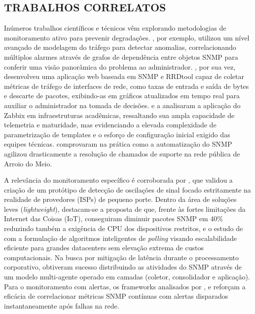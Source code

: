 \documentclass[12pt,a4paper]{article}
\begin{document}
\subsection{TRABALHOS CORRELATOS}
Inúmeros trabalhos científicos e técnicos vêm explorando metodologias de monitoramento ativo para prevenir degradações. , por exemplo, utilizou um nível avançado de modelagem do tráfego para detectar anomalias, correlacionando múltiplos alarmes através de grafos de dependência entre objetos SNMP para conferir uma visão panorâmica do problema ao administrador. , por sua vez, desenvolveu uma aplicação web baseada em SNMP e RRDtool capaz de coletar métricas de tráfego de interfaces de rede, como taxas de entrada e saída de bytes e descarte de pacotes, exibindo-as em gráficos atualizados em tempo real para auxiliar o administrador na tomada de decisões.  e a  analisaram a aplicação do Zabbix em infraestruturas acadêmicas, ressaltando sua ampla capacidade de telemetria e maturidade, mas evidenciando a elevada complexidade de parametrização de templates e o esforço de configuração inicial exigido das equipes técnicas.  comprovaram na prática como a automatização do SNMP agilizou drasticamente a resolução de chamados de suporte na rede pública de Arroio do Meio.

A relevância do monitoramento específico é corroborada por , que validou a criação de um protótipo de detecção de oscilações de sinal focado estritamente na realidade de provedores (ISPs) de pequeno porte. Dentro da área de soluções leves (\textit{lightweight}), destacam-se a proposta de  que, frente às fortes limitações da Internet das Coisas (IoT), conseguiram diminuir pacotes SNMP em 40\% reduzindo também a exigência de CPU dos dispositivos restritos, e o estudo de  com a formulação de algoritmos inteligentes de \textit{polling} visando escalabilidade eficiente para grandes datacenters sem elevação extrema de custos computacionais. Na busca por mitigação de latência durante o processamento corporativo,  obtiveram sucesso distribuindo as atividades do SNMP através de um modelo multi-agente operado em camadas (coletor, consolidador e aplicação). Para o monitoramento com alertas, os frameworks analisados por ,  e  reforçam a eficácia de correlacionar métricas SNMP contínuas com alertas disparados instantaneamente após falhas na rede.
\end{document}
